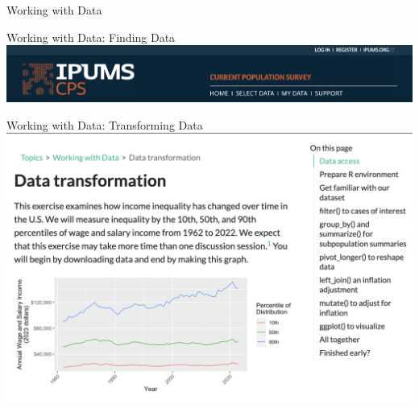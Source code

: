 \documentclass{beamer}
\begin{document}
\begin{frame}
\huge Working with Data
\end{frame}

\begin{frame}{Working with Data: Finding Data}
\includegraphics[width = \textwidth]{figures/ipums_register_1.png}
\end{frame}

\begin{frame}{Working with Data: Transforming Data}
\includegraphics[width = \textwidth]{figures/transform}
\end{frame}

\end{document}
